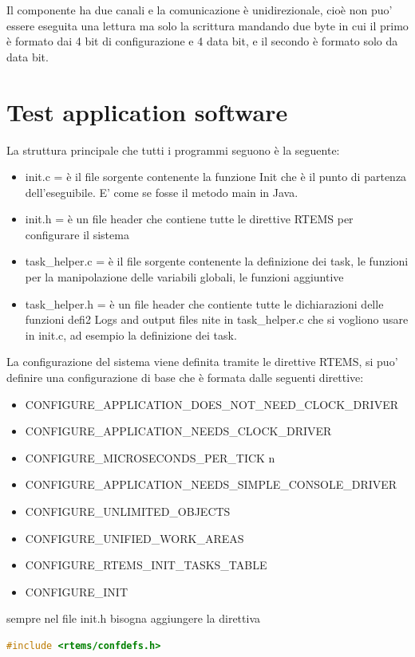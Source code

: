 \documentclass[12pt, a4paper, titlepage, oneside]{book}
\begin{document}
\begin{flushleft}
Il componente ha due canali e la comunicazione è unidirezionale, cioè non puo' essere eseguita una lettura ma solo la scrittura mandando due byte in cui il primo è formato dai 4 bit di configurazione e 4 data bit, e il secondo è formato solo da data bit.


\newpage
\section{Test application software}
La struttura principale che tutti i programmi seguono è la seguente:
\begin{itemize}
    \item init.c = è il file sorgente contenente la funzione Init che è il punto di partenza dell'eseguibile. E' come se fosse il metodo main in Java.
    \item init.h = è un file header che contiene tutte le direttive RTEMS per configurare il sistema
    \item task\_helper.c = è il file sorgente contenente la definizione dei task, le funzioni per la manipolazione delle variabili globali, le funzioni aggiuntive 
    \item task\_helper.h = è un file header che contiente tutte le dichiarazioni delle funzioni defi2
Logs and output files
nite in task\_helper.c che si vogliono usare in init.c, ad esempio la definizione dei task.
\end{itemize}
La configurazione del sistema viene definita tramite le direttive RTEMS, si puo' definire una configurazione di base che è formata dalle seguenti direttive:
\begin{itemize}
    \item CONFIGURE\_APPLICATION\_DOES\_NOT\_NEED\_CLOCK\_DRIVER
    \item CONFIGURE\_APPLICATION\_NEEDS\_CLOCK\_DRIVER
    \item CONFIGURE\_MICROSECONDS\_PER\_TICK n 
    \item CONFIGURE\_APPLICATION\_NEEDS\_SIMPLE\_CONSOLE\_DRIVER
    \item CONFIGURE\_UNLIMITED\_OBJECTS
    \item CONFIGURE\_UNIFIED\_WORK\_AREAS
    \item CONFIGURE\_RTEMS\_INIT\_TASKS\_TABLE
    \item CONFIGURE\_INIT
\end{itemize}
sempre nel file init.h bisogna aggiungere la direttiva 
\begin{lstlisting}[language = C]
#include <rtems/confdefs.h>


\end{lstlisting}
\end{flushleft}
\end{document}
